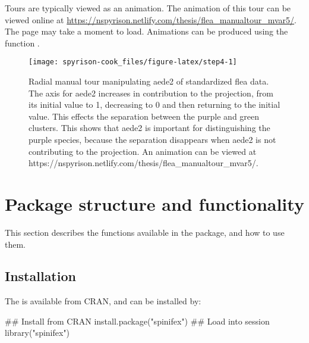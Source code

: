 Tours are typically viewed as an animation. The animation of this tour
can be viewed online at
\url{https://nspyrison.netlify.com/thesis/flea_manualtour_mvar5/}. The
page may take a moment to load. Animations can be produced using the
function .

\begin{Schunk}
\begin{figure}

{\centering \texttt{[image: spyrison-cook\_files/figure-latex/step4-1]} 

}

\caption[Radial manual tour manipulating aede2 of standardized flea data]{Radial manual tour manipulating aede2 of standardized flea data. The axis for aede2 increases in contribution to the projection, from its initial value to 1, decreasing to 0 and then returning to the initial value. This effects the separation between the purple and green clusters. This shows that aede2 is important for distinguishing the purple species, because the separation disappears when aede2 is not contributing to the projection. An animation can be viewed at https://nspyrison.netlify.com/thesis/flea\_manualtour\_mvar5/.}\label{fig:step4}
\end{figure}
\end{Schunk}

\hypertarget{package-structure-and-functionality}{%
\section{Package structure and
functionality}\label{package-structure-and-functionality}}

This section describes the functions available in the package, and how
to use them.

\hypertarget{installation}{%
\subsection{Installation}\label{installation}}

The  is available from CRAN, and can be installed by:

\begin{Schunk}
\begin{Sinput}
## Install from CRAN
install.package("spinifex")
## Load into session
library("spinifex")
\end{Sinput}
\end{Schunk}

